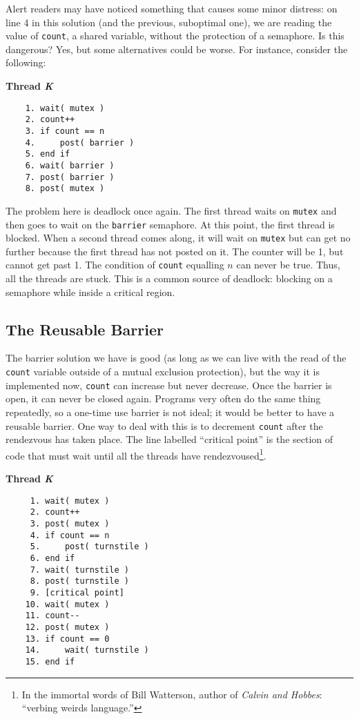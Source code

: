 Alert readers may have noticed something that causes some minor distress: on line 4 in this solution (and the previous, suboptimal one), we are reading the value of \texttt{count}, a shared variable, without the protection of a semaphore. Is this dangerous? Yes, but some alternatives could be worse. For instance, consider the following:

\textbf{Thread \textit{K}}\vspace{-2em}
\begin{verbatim}
	1. wait( mutex )
	2. count++
	3. if count == n
	4.     post( barrier )
	5. end if
	6. wait( barrier )
	7. post( barrier )
	8. post( mutex )
  \end{verbatim}
\vspace{-2em}

The problem here is deadlock once again. The first thread waits on \texttt{mutex} and then goes to wait on the \texttt{barrier} semaphore. At this point, the first thread is blocked. When a second thread comes along, it will wait on \texttt{mutex} but can get no further because the first thread has not posted on it. The counter will be 1, but cannot get past 1. The condition of \texttt{count} equalling $n$ can never be true. Thus, all the threads are stuck. This is a common source of deadlock: blocking on a semaphore while inside a critical region.

\subsection*{The Reusable Barrier}
The barrier solution we have is good (as long as we can live with the read of the \texttt{count} variable outside of a mutual exclusion protection), but the way it is implemented now, \texttt{count} can increase but never decrease. Once the barrier is open, it can never be closed again. Programs very often do the same thing repeatedly, so a one-time use barrier is not ideal; it would be better to have a reusable barrier. One way to deal with this is to decrement \texttt{count} after the rendezvous has taken place. The line labelled ``critical point'' is the section of code that must wait until all the threads have rendezvoused\footnote{In the immortal words of Bill Watterson, author of \textit{Calvin and Hobbes}: ``verbing weirds language.''}.


\textbf{Thread \textit{K}}\vspace{-2em}
\begin{verbatim}
	 1. wait( mutex )
	 2. count++
	 3. post( mutex )
	 4. if count == n
	 5.     post( turnstile )
	 6. end if
	 7. wait( turnstile )
	 8. post( turnstile )
	 9. [critical point]
	10. wait( mutex )
	11. count--
	12. post( mutex )
	13. if count == 0
	14.     wait( turnstile )
	15. end if
  \end{verbatim}
\vspace{-2em}

